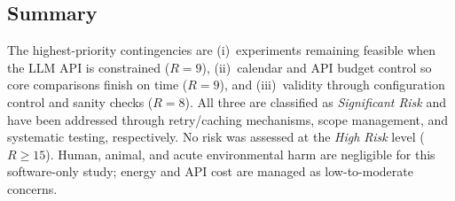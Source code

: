 \subsection*{Summary}

The highest-priority contingencies are (i)~experiments remaining feasible when
the LLM API is constrained ($R{=}9$), (ii)~calendar and API budget control so
core comparisons finish on time ($R{=}9$), and (iii)~validity through
configuration control and sanity checks ($R{=}8$). All three are classified as
\emph{Significant Risk} and have been addressed through retry/caching
mechanisms, scope management, and systematic testing, respectively. No risk was
assessed at the \emph{High Risk} level ($R \geq 15$). Human, animal, and acute
environmental harm are negligible for this software-only study; energy and API
cost are managed as low-to-moderate concerns.
